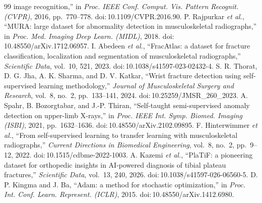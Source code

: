 \documentclass[conference]{IEEEtran}
\begin{document}
\begin{thebibliography}{99}
image recognition,'' in \textit{Proc. IEEE Conf. Comput. Vis. Pattern Recognit.
(CVPR)}, 2016, pp.~770--778. doi:\,10.1109/CVPR.2016.90.
 P. Rajpurkar \textit{et al.}, ``MURA: large dataset for
abnormality detection in musculoskeletal radiographs,'' in \textit{Proc. Med. Imaging
Deep Learn. (MIDL)}, 2018. doi:\,10.48550/arXiv.1712.06957.
 I. Abedeen \textit{et al.}, ``FracAtlas: a dataset for
fracture classification, localization and segmentation of musculoskeletal
radiographs,'' \textit{Scientific Data}, vol.~10, 521, 2023. doi:\,10.1038/s41597-023-02432-4.
 S. R. Thorat, D. G. Jha, A. K. Sharma, and D. V. Katkar, ``Wrist
fracture detection using self-supervised learning methodology,'' \textit{Journal of
Musculoskeletal Surgery and Research}, vol.~8, no.~2, pp.~133--141, 2024. doi:\,10.25259/JMSR\_260\_2023.
 A. Spahr, B. Bozorgtabar, and J.-P. Thiran, ``Self-taught
semi-supervised anomaly detection on upper-limb X-rays,'' in \textit{Proc. IEEE Int.
Symp. Biomed. Imaging (ISBI)}, 2021, pp.~1632--1636. doi:\,10.48550/arXiv.2102.09895.
 F. Hinterwimmer \textit{et al.}, ``From self-supervised learning to
transfer learning with musculoskeletal radiographs,'' \textit{Current Directions in
Biomedical Engineering}, vol.~8, no.~2, pp.~9--12, 2022. doi:\,10.1515/cdbme-2022-1003.
 A. Kazemi \textit{et al.}, ``PlaTiF: a pioneering dataset for
orthopedic insights in AI-powered diagnosis of tibial plateau fractures,''
\textit{Scientific Data}, vol.~13, 240, 2026. doi:\,10.1038/s41597-026-06560-5.
 D. P. Kingma and J. Ba, ``Adam: a method for stochastic
optimization,'' in \textit{Proc. Int. Conf. Learn. Represent. (ICLR)}, 2015. doi:\,10.48550/arXiv.1412.6980.
\end{thebibliography}
\end{document}

